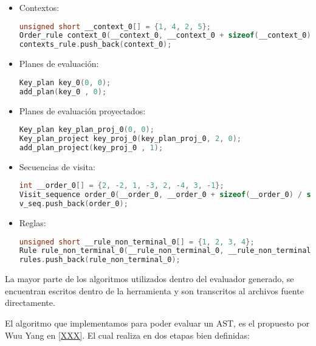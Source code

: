 \begin{itemize}
\item Contextos:
\begin{lstlisting}[language=C++, basicstyle=\scriptsize, columns=fullflexible, linewidth=14cm]
unsigned short __context_0[] = {1, 4, 2, 5};
Order_rule context_0(__context_0, __context_0 + sizeof(__context_0) / sizeof(unsigned short));
contexts_rule.push_back(context_0);
\end{lstlisting}

\item Planes de evaluación:
\begin{lstlisting}[language=C++, basicstyle=\scriptsize, columns=fullflexible, linewidth=9cm]
Key_plan key_0(0, 0);
add_plan(key_0 , 0);
\end{lstlisting}

\item Planes de evaluación proyectados:
\begin{lstlisting}[language=C++, basicstyle=\scriptsize, columns=fullflexible, linewidth=9cm]
Key_plan key_plan_proj_0(0, 0);
Key_plan_project key_proj_0(key_plan_proj_0, 2, 0);
add_plan_project(key_proj_0 , 1);
\end{lstlisting}

\item Secuencias de visita:
\begin{lstlisting}[language=C++, basicstyle=\scriptsize, columns=fullflexible, linewidth=12cm]
int __order_0[] = {2, -2, 1, -3, 2, -4, 3, -1};
Visit_sequence order_0(__order_0, __order_0 + sizeof(__order_0) / sizeof(int));
v_seq.push_back(order_0);
\end{lstlisting}

\item Reglas:
\begin{lstlisting}[language=C++, basicstyle=\scriptsize, columns=fullflexible]
unsigned short __rule_non_terminal_0[] = {1, 2, 3, 4};
Rule rule_non_terminal_0(__rule_non_terminal_0, __rule_non_terminal_0 + sizeof(__rule_non_terminal_0) / sizeof(unsigned short));
rules.push_back(rule_non_terminal_0);
\end{lstlisting}
\end{itemize}

La mayor parte de los algoritmos utilizados dentro del evaluador generado, se encuentran escritos dentro de la herramienta y son transcritos al archivos fuente directamente.

El algoritmo que implementamos para poder evaluar un AST, es el propuesto por Wuu Yang en \ref{XXX}. El cual realiza en dos etapas bien definidas:

